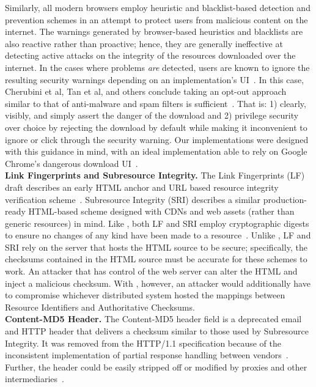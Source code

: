 Similarly, all modern browsers employ heuristic and blacklist-based detection
and prevention schemes in an attempt to protect users from malicious content on
the internet. The warnings generated by browser-based heuristics and blacklists
are also reactive rather than proactive; hence, they are generally ineffective
at detecting active attacks on the integrity of the resources downloaded over
the internet. In the cases where problems \emph{are} detected, users are known
to ignore the resulting security warnings depending on an implementation's
UI~\cite{Modic, Akhawe, ChromeClickThrough}. In this case, Cherubini et al, Tan
et al, and others conclude taking an opt-out approach similar to that of
anti-malware and spam filters is sufficient~\cite{Cherubini, Tan}. That is: 1)
clearly, visibly, and simply assert the danger of the download and 2) privilege
security over choice by rejecting the download by default while making it
inconvenient to ignore or click through the security warning. Our \SYSTEM{}
implementations were designed with this guidance in mind, with an ideal
implementation able to rely on Google Chrome's dangerous download
UI~\cite{ChromeClickThrough}. \\

\noindent\textbf{Link Fingerprints and Subresource Integrity.} The Link
Fingerprints (LF) draft describes an early HTML anchor and URL based resource
integrity verification scheme~\cite{LF}. Subresource Integrity (SRI) describes a
similar production-ready HTML-based scheme designed with CDNs and web assets
(rather than generic resources) in mind. Like \SYSTEM{}, both LF and SRI employ
cryptographic digests to ensure no changes of any kind have been made to a
resource~\cite{SRI}. Unlike \SYSTEM{}, LF and SRI rely on the server that hosts
the HTML source to be secure; specifically, the checksums contained in the HTML
source must be accurate for these schemes to work. An attacker that has control
of the web server can alter the HTML and inject a malicious checksum. With
\SYSTEM{}, however, an attacker would additionally have to compromise whichever
distributed system hosted the mappings between Resource Identifiers and
Authoritative Checksums. \\

\noindent\textbf{Content-MD5 Header.} The Content-MD5 header field is a
deprecated email and HTTP header that delivers a checksum similar to those used
by Subresource Integrity. It was removed from the HTTP/1.1 specification because
of the inconsistent implementation of partial response handling between
vendors~\cite{HTTP1.1}. Further, the header could be easily stripped off or
modified by proxies and other intermediaries~\cite{MD5Header}. \\

